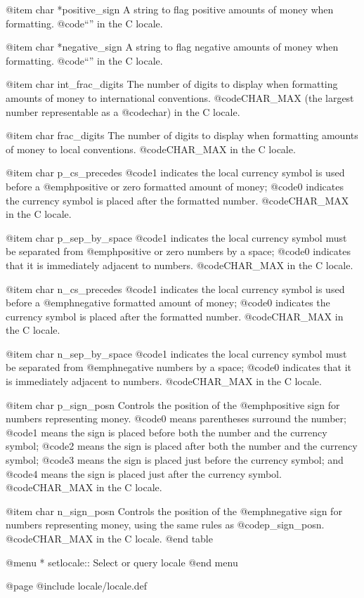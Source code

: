 @item char *positive_sign
A string to flag positive amounts of money when formatting.
@code{``''} in the C locale.

@item char *negative_sign
A string to flag negative amounts of money when formatting.
@code{``''} in the C locale.

@item char int_frac_digits
The number of digits to display when formatting amounts of money to
international conventions.
@code{CHAR_MAX} (the largest number representable as a @code{char}) in
the C locale. 

@item char frac_digits
The number of digits to display when formatting amounts of money to
local conventions.
@code{CHAR_MAX} in the C locale. 

@item char p_cs_precedes
@code{1} indicates the local currency symbol is used before a
@emph{positive or zero} formatted amount of money; @code{0} indicates
the currency symbol is placed after the formatted number.
@code{CHAR_MAX} in the C locale. 

@item char p_sep_by_space
@code{1} indicates the local currency symbol must be separated from
@emph{positive or zero} numbers by a space; @code{0} indicates that it
is immediately adjacent to numbers.
@code{CHAR_MAX} in the C locale. 

@item char n_cs_precedes
@code{1} indicates the local currency symbol is used before a
@emph{negative} formatted amount of money; @code{0} indicates
the currency symbol is placed after the formatted number.
@code{CHAR_MAX} in the C locale. 

@item char n_sep_by_space
@code{1} indicates the local currency symbol must be separated from
@emph{negative} numbers by a space; @code{0} indicates that it
is immediately adjacent to numbers.
@code{CHAR_MAX} in the C locale. 

@item char p_sign_posn
Controls the position of the @emph{positive} sign for
numbers representing money.  @code{0} means parentheses surround the
number; @code{1} means the sign is placed before both the number and the
currency symbol; @code{2} means the sign is placed after both the number
and the currency symbol; @code{3} means the sign is placed just before
the currency symbol; and @code{4} means the sign is placed just after
the currency symbol.
@code{CHAR_MAX} in the C locale. 

@item char n_sign_posn
Controls the position of the @emph{negative} sign for numbers
representing money, using the same rules as @code{p_sign_posn}.
@code{CHAR_MAX} in the C locale. 
@end table

@menu
* setlocale::  Select or query locale
@end menu

@page
@include locale/locale.def
